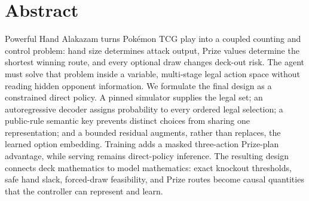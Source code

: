 \section*{Abstract}

Powerful Hand Alakazam turns Pok\'emon TCG play into a coupled counting and
control problem: hand size determines attack output, Prize values determine
the shortest winning route, and every optional draw changes deck-out risk.
The agent must solve that problem inside a variable, multi-stage legal action
space without reading hidden opponent information. We formulate the final
design as a constrained direct policy. A pinned simulator supplies the legal
set; an autoregressive decoder assigns probability to every ordered legal
selection; a public-rule semantic key prevents distinct choices from sharing
one representation; and a bounded residual augments, rather than replaces,
the learned option embedding. Training adds a masked three-action Prize-plan
advantage, while serving remains direct-policy inference. The resulting
design connects deck mathematics to model mathematics: exact knockout
thresholds, safe hand slack, forced-draw feasibility, and Prize routes become
causal quantities that the controller can represent and learn.
